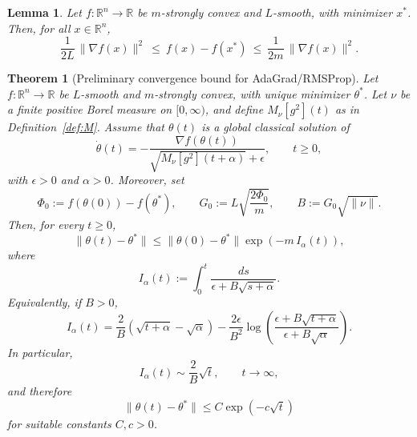 \documentclass[10pt,a4paper]{amsart}
\newtheorem{lemma}{Lemma}
\newtheorem{theorem}{Theorem}
\begin{document}
\begin{lemma}\label{lem:grad_bounds}
Let \( f : \mathbb{R}^n \to \mathbb{R} \) be \(m\)-strongly convex and \(L\)-smooth, with minimizer \(x^*\).  
Then, for all \( x \in \mathbb{R}^n \),
\[
    \frac{1}{2L} \, \|\nabla f(x)\|^2 
    \ \leq\ f(x) - f(x^*) 
    \ \leq\ \frac{1}{2m} \, \|\nabla f(x)\|^2.
\]
\end{lemma}

\begin{theorem}[Preliminary convergence bound for AdaGrad/RMSProp]
\label{thm:adagrad_rmsprop_memory}
Let \(f:\mathbb R^n\to\mathbb R\) be \(L\)-smooth and \(m\)-strongly convex, with unique minimizer \(\theta^*\). Let \(\nu\) be a finite positive Borel measure on \([0,\infty)\), and define \(M_\nu[g^2](t)\) as in Definition~\ref{def:M}. Assume that \(\theta(t)\) is a global classical solution of
\[
\dot\theta(t)
=
-
\frac{\nabla f(\theta(t))}
{\sqrt{M_\nu[g^2](t+\alpha)}+\epsilon},
\qquad t\ge 0,
\]
with \(\epsilon>0\) and \(\alpha>0\). Moreover, set
\[
\Phi_0:=f(\theta(0))-f(\theta^*),
\qquad
G_0:=L\sqrt{\frac{2\Phi_0}{m}},
\qquad
B:=G_0\sqrt{\|\nu\|}.
\]
Then, for every \(t\ge 0\),
\[
\|\theta(t)-\theta^*\|
\le
\|\theta(0)-\theta^*\|
\exp\!\left(-m\,I_\alpha(t)\right),
\]
where
\[
I_\alpha(t)
:=
\int_0^t
\frac{ds}{\epsilon+B\sqrt{s+\alpha}}.
\]
Equivalently, if \(B>0\),
\[
I_\alpha(t)
=
\frac{2}{B}
\left(\sqrt{t+\alpha}-\sqrt{\alpha}\right)
-
\frac{2\epsilon}{B^2}
\log\!\left(
\frac{\epsilon+B\sqrt{t+\alpha}}
{\epsilon+B\sqrt{\alpha}}
\right).
\]
In particular,
\[
I_\alpha(t)\sim \frac{2}{B}\sqrt t,
\qquad t\to\infty,
\]
and therefore
\begin{equation}\label{th1:bound}
\|\theta(t)-\theta^*\|
\le
C\exp(-c\sqrt t)
\end{equation}
for suitable constants \(C,c>0\).
\end{theorem}
\end{document}
